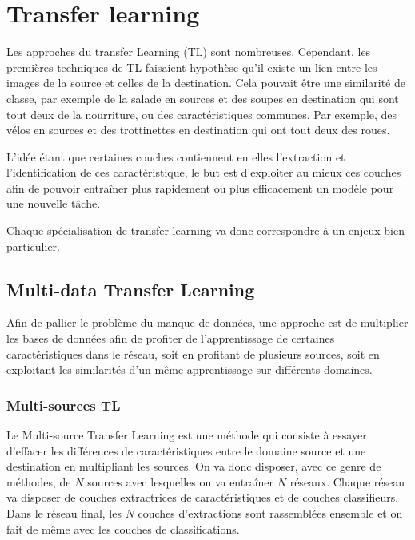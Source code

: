 \chapter{Transfer learning}
\label{chap:transfer-learning}

Les approches du transfer Learning (TL) sont nombreuses. Cependant, les premières techniques de TL faisaient hypothèse qu'il existe un lien entre les images de la source et celles de la destination. Cela pouvait être une similarité de classe, par exemple de la salade en sources et des soupes en destination qui sont tout deux de la nourriture, ou des caractéristiques communes. Par exemple, des vélos en sources et des trottinettes en destination qui ont tout deux des roues.

L'idée étant que certaines couches contiennent en elles l'extraction et l'identification de ces caractéristique, le but est d'exploiter au mieux ces couches afin de pouvoir entraîner plus rapidement ou plus efficacement un modèle pour une nouvelle tâche.

Chaque spécialisation de transfer learning va donc correspondre à un enjeux bien particulier.

\section{Multi-data Transfer Learning}
\label{sec:multi-data}
Afin de pallier le problème du manque de données, une approche est de multiplier les bases de données afin de profiter de l'apprentissage de certaines caractéristiques dans le réseau, soit en profitant de plusieurs sources, soit en exploitant les similarités d'un même apprentissage sur différents domaines.

\subsection{Multi-sources TL}
\label{subsec:multi-sources}

Le Multi-source Transfer Learning \cite{multi-source} est une méthode qui consiste à essayer d'effacer les différences de caractéristiques entre le domaine source et une destination en multipliant les sources. On va donc disposer, avec ce genre de méthodes, de $N$ sources avec lesquelles on va entraîner $N$ réseaux. Chaque réseau va disposer de couches extractrices de caractéristiques et de couches classifieurs. Dans le réseau final, les $N$ couches d'extractions sont rassemblées ensemble et on fait de même avec les couches de classifications.

